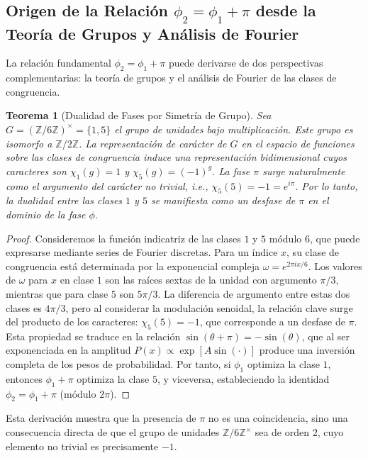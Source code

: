 \documentclass[12pt,a4paper]{article}
\theoremstyle{plain}
\newtheorem{teorema}{Teorema}[section]
\theoremstyle{definition}
\theoremstyle{remark}
\newcommand{\Zmod}{\mathbb{Z}/6\mathbb{Z}}
\begin{document}
\subsection{Origen de la Relación $\phi_2 = \phi_1 + \pi$ desde la Teoría de Grupos y Análisis de Fourier}

La relación fundamental $\phi_2 = \phi_1 + \pi$ puede derivarse de dos perspectivas complementarias: la teoría de grupos y el análisis de Fourier de las clases de congruencia.

\begin{teorema}[Dualidad de Fases por Simetría de Grupo]
Sea $G = (\mathbb{Z}/6\mathbb{Z})^{\times} = \{1,5\}$ el grupo de unidades bajo multiplicación. Este grupo es isomorfo a $\mathbb{Z}/2\mathbb{Z}$. La representación de carácter de $G$ en el espacio de funciones sobre las clases de congruencia induce una representación bidimensional cuyos caracteres son $\chi_1(g)=1$ y $\chi_5(g)=(-1)^{g}$. La fase $\pi$ surge naturalmente como el argumento del carácter no trivial, i.e., $\chi_5(5) = -1 = e^{i\pi}$. Por lo tanto, la dualidad entre las clases $1$ y $5$ se manifiesta como un desfase de $\pi$ en el dominio de la fase $\phi$.
\end{teorema}

\begin{proof}
Consideremos la función indicatriz de las clases $1$ y $5$ módulo $6$, que puede expresarse mediante series de Fourier discretas. Para un índice $x$, su clase de congruencia está determinada por la exponencial compleja $\omega = e^{2\pi i x/6}$. Los valores de $\omega$ para $x$ en clase $1$ son las raíces sextas de la unidad con argumento $\pi/3$, mientras que para clase $5$ son $5\pi/3$. La diferencia de argumento entre estas dos clases es $4\pi/3$, pero al considerar la modulación senoidal, la relación clave surge del producto de los caracteres: $\chi_5(5) = -1$, que corresponde a un desfase de $\pi$. Esta propiedad se traduce en la relación $\sin(\theta + \pi) = -\sin(\theta)$, que al ser exponenciada en la amplitud $P(x) \propto \exp[A\sin(\cdot)]$ produce una inversión completa de los pesos de probabilidad. Por tanto, si $\phi_1$ optimiza la clase $1$, entonces $\phi_1+\pi$ optimiza la clase $5$, y viceversa, estableciendo la identidad $\phi_2 = \phi_1 + \pi$ (módulo $2\pi$).
\end{proof}

Esta derivación muestra que la presencia de $\pi$ no es una coincidencia, sino una consecuencia directa de que el grupo de unidades $\Zmod^{\times}$ sea de orden $2$, cuyo elemento no trivial es precisamente $-1$.
\end{document}
